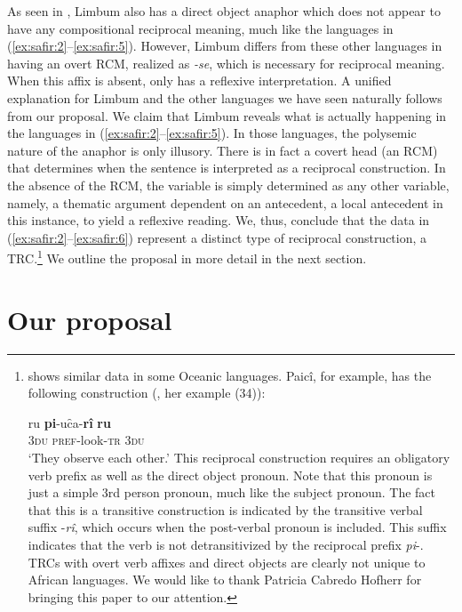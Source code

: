 \documentclass[output=paper]{langsci/langscibook}
\begin{document}
As seen in , Limbum also has a direct object anaphor which does not appear to have any compositional reciprocal meaning, much like the languages in (\ref{ex:safir:2}--\ref{ex:safir:5}). However, Limbum differs from these other languages in having an overt RCM, realized as \textit{-se}, which is necessary for reciprocal meaning. When this affix is absent,  only has a reflexive interpretation. A unified explanation for Limbum and the other languages we have seen naturally follows from our proposal. We claim that Limbum reveals what is actually happening in the languages in (\ref{ex:safir:2}--\ref{ex:safir:5}). In those languages, the polysemic nature of the anaphor is only illusory. There is in fact a covert head (an RCM) that determines when the sentence is interpreted as a reciprocal construction. In the absence of the RCM, the variable is simply determined as any other variable, namely, a thematic argument dependent on an antecedent, a local antecedent in this instance, to yield a reflexive reading. We, thus, conclude that the data in (\ref{ex:safir:2}--\ref{ex:safir:6}) represent a distinct type of reciprocal construction, a TRC.\footnote{\citet{MoysieFaurie2008} shows similar data in some Oceanic languages. Paicî, for example, has the following construction (\citealt[121]{MoysieFaurie2008}, her example (34)):

\ea\label{ex:safir:i}
\gll  \textup{ru}  \textup{\textbf{pi}-uc̑a-\textbf{rî}  \textbf{ru}}\\
 \textsc{3du}  \textsc{pref}-look-\textsc{tr}  \textsc{3du}\\
\glt  ‘They observe each other.’
\z 
This reciprocal construction requires an obligatory verb prefix as well as the direct object pronoun. Note that this pronoun is just a simple 3rd person pronoun, much like the subject pronoun. The fact that this is a transitive construction is indicated by the transitive verbal suffix -\textit{rî}, which occurs when the post-verbal pronoun is included. This suffix indicates that the verb is not detransitivized by the reciprocal prefix \textit{pi}-. TRCs with overt verb affixes and direct objects are clearly not unique to African languages. We would like to thank Patricia Cabredo Hofherr for bringing this paper to our attention.} We outline the proposal in more detail in the next section.

\section{Our proposal} \label{sec:safir:3}
\end{document}
